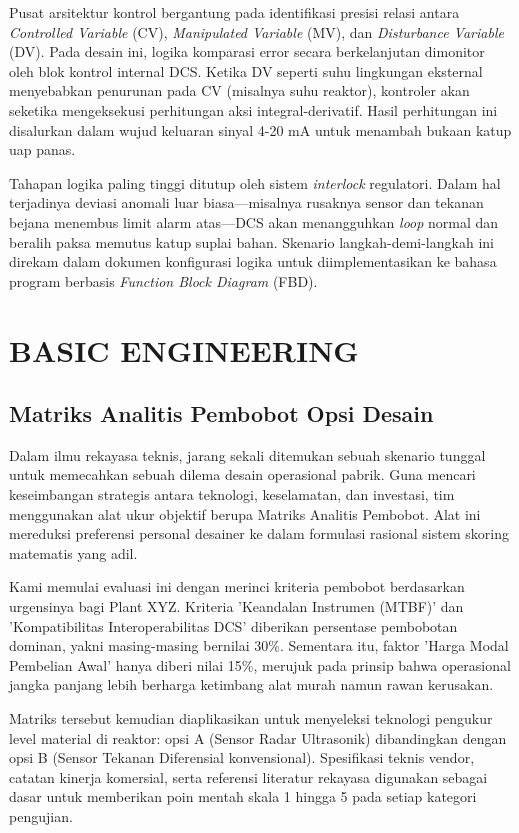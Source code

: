 \documentclass[12pt, a4paper]{report}
\begin{document}
Pusat arsitektur kontrol bergantung pada identifikasi presisi relasi antara \textit{Controlled Variable} (CV), \textit{Manipulated Variable} (MV), dan \textit{Disturbance Variable} (DV). Pada desain ini, logika komparasi error secara berkelanjutan dimonitor oleh blok kontrol internal DCS. Ketika DV seperti suhu lingkungan eksternal menyebabkan penurunan pada CV (misalnya suhu reaktor), kontroler akan seketika mengeksekusi perhitungan aksi integral-derivatif. Hasil perhitungan ini disalurkan dalam wujud keluaran sinyal 4-20 mA untuk menambah bukaan katup uap panas.

Tahapan logika paling tinggi ditutup oleh sistem \textit{interlock} regulatori. Dalam hal terjadinya deviasi anomali luar biasa—misalnya rusaknya sensor dan tekanan bejana menembus limit alarm atas—DCS akan menangguhkan \textit{loop} normal dan beralih paksa memutus katup suplai bahan. Skenario langkah-demi-langkah ini direkam dalam dokumen konfigurasi logika untuk diimplementasikan ke bahasa program berbasis \textit{Function Block Diagram} (FBD).

\chapter{BASIC ENGINEERING}

\section{Matriks Analitis Pembobot Opsi Desain}
Dalam ilmu rekayasa teknis, jarang sekali ditemukan sebuah skenario tunggal untuk memecahkan sebuah dilema desain operasional pabrik. Guna mencari keseimbangan strategis antara teknologi, keselamatan, dan investasi, tim menggunakan alat ukur objektif berupa Matriks Analitis Pembobot. Alat ini mereduksi preferensi personal desainer ke dalam formulasi rasional sistem skoring matematis yang adil.

Kami memulai evaluasi ini dengan merinci kriteria pembobot berdasarkan urgensinya bagi Plant XYZ. Kriteria 'Keandalan Instrumen (MTBF)' dan 'Kompatibilitas Interoperabilitas DCS' diberikan persentase pembobotan dominan, yakni masing-masing bernilai 30\%. Sementara itu, faktor 'Harga Modal Pembelian Awal' hanya diberi nilai 15\%, merujuk pada prinsip bahwa operasional jangka panjang lebih berharga ketimbang alat murah namun rawan kerusakan.

Matriks tersebut kemudian diaplikasikan untuk menyeleksi teknologi pengukur level material di reaktor: opsi A (Sensor Radar Ultrasonik) dibandingkan dengan opsi B (Sensor Tekanan Diferensial konvensional). Spesifikasi teknis vendor, catatan kinerja komersial, serta referensi literatur rekayasa digunakan sebagai dasar untuk memberikan poin mentah skala 1 hingga 5 pada setiap kategori pengujian.
\end{document}
